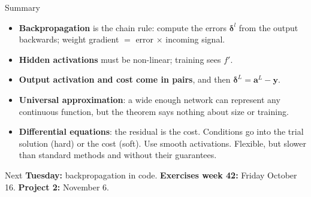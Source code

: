 \documentclass[10pt,aspectratio=169]{beamer}
\begin{document}
\begin{frame}{Summary}
\begin{itemize}
  \item \textbf{Backpropagation} is the chain rule: compute the errors
        $\bm{\delta}^{l}$ from the output backwards; weight gradient $=$
        error $\times$ incoming signal.
  \item \textbf{Hidden activations} must be non-linear; training sees $f'$.
  \item \textbf{Output activation and cost come in pairs}, and then
        $\bm{\delta}^{L}=\bm{a}^{L}-\bm{y}$.
  \item \textbf{Universal approximation}: a wide enough network can
        represent any continuous function, but the theorem says nothing
        about size or training.
  \item \textbf{Differential equations}: the residual is the cost.
        Conditions go into the trial solution (hard) or the cost (soft).
        Use smooth activations.  Flexible, but slower than standard
        methods and without their guarantees.
\end{itemize}
\vspace{4pt}
\begin{block}{Next}
\textbf{Tuesday:} backpropagation in code.  \textbf{Exercises week 42:}
Friday October 16.  \textbf{Project 2:} November 6.
\end{block}
\end{frame}
\end{document}
